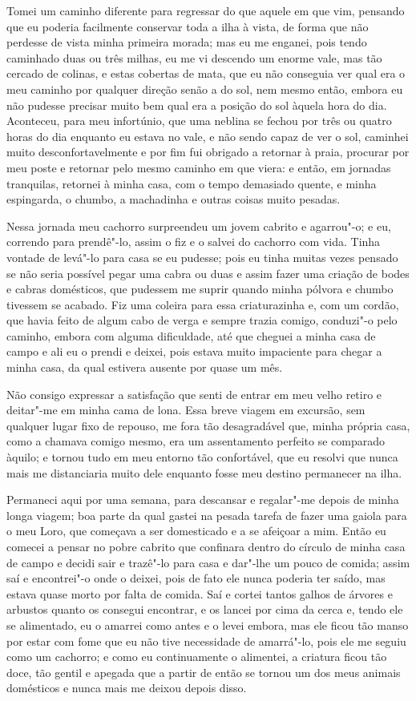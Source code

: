 Tomei um caminho diferente para regressar do que aquele em que vim,
pensando que eu poderia facilmente conservar toda a ilha à vista, de
forma que não perdesse de vista minha primeira morada; mas eu me
enganei, pois tendo caminhado duas ou três milhas, eu me vi descendo um
enorme vale, mas tão cercado de colinas, e estas cobertas de mata, que
eu não conseguia ver qual era o meu caminho por qualquer direção senão a
do sol, nem mesmo então, embora eu não pudesse precisar muito bem qual
era a posição do sol àquela hora do dia. Aconteceu, para meu infortúnio,
que uma neblina se fechou por três ou quatro horas do dia enquanto eu
estava no vale, e não sendo capaz de ver o sol, caminhei muito
desconfortavelmente e por fim fui obrigado a retornar à praia, procurar
por meu poste e retornar pelo mesmo caminho em que viera: e então, em
jornadas tranquilas, retornei à minha casa, com o tempo demasiado
quente, e minha espingarda, o chumbo, a machadinha e outras coisas muito
pesadas.

Nessa jornada meu cachorro surpreendeu um jovem cabrito e agarrou"-o; e
eu, correndo para prendê"-lo, assim o fiz e o salvei do cachorro com
vida. Tinha vontade de levá"-lo para casa se eu pudesse; pois eu tinha
muitas vezes pensado se não seria possível pegar uma cabra ou duas e
assim fazer uma criação de bodes e cabras domésticos, que pudessem me
suprir quando minha pólvora e chumbo tivessem se acabado. Fiz uma
coleira para essa criaturazinha e, com um cordão, que havia feito de
algum cabo de verga e sempre trazia comigo, conduzi"-o pelo caminho,
embora com alguma dificuldade, até que cheguei a minha casa de campo e
ali eu o prendi e deixei, pois estava muito impaciente para chegar a
minha casa, da qual estivera ausente por quase um mês.

Não consigo expressar a satisfação que senti de entrar em meu velho
retiro e deitar"-me em minha cama de lona. Essa breve viagem em excursão,
sem qualquer lugar fixo de repouso, me fora tão desagradável que, minha
própria casa, como a chamava comigo mesmo, era um assentamento perfeito
se comparado àquilo; e tornou tudo em meu entorno tão confortável, que
eu resolvi que nunca mais me distanciaria muito dele enquanto fosse meu
destino permanecer na ilha.

Permaneci aqui por uma semana, para descansar e regalar"-me depois de
minha longa viagem; boa parte da qual gastei na pesada tarefa de fazer
uma gaiola para o meu Loro, que começava a ser domesticado e a se
afeiçoar a mim. Então eu comecei a pensar no pobre cabrito que confinara
dentro do círculo de minha casa de campo e decidi sair e trazê"-lo para
casa e dar"-lhe um pouco de comida; assim saí e encontrei"-o onde o
deixei, pois de fato ele nunca poderia ter saído, mas estava quase morto
por falta de comida. Saí e cortei tantos galhos de árvores e arbustos
quanto os consegui encontrar, e os lancei por cima da cerca e, tendo ele
se alimentado, eu o amarrei como antes e o levei embora, mas ele ficou
tão manso por estar com fome que eu não tive necessidade de amarrá"-lo,
pois ele me seguiu como um cachorro; e como eu continuamente o
alimentei, a criatura ficou tão doce, tão gentil e apegada que a partir
de então se tornou um dos meus animais domésticos e nunca mais me deixou
depois disso.

